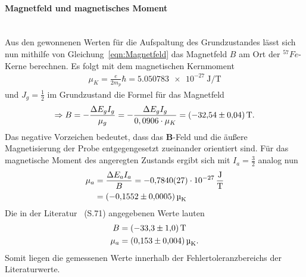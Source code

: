 \documentclass[a4paper,twoside,final]{article}
\begin{document}
\paragraph{Magnetfeld und magnetisches Moment}$~$\\
Aus den gewonnenen Werten für die Aufspaltung des Grundzustandes lässt sich nun mithilfe von Gleichung~\eqref{eqn:Magnetfeld} das Magnetfeld $B$ am Ort der $^{57}Fe$-Kerne berechnen. Es folgt mit dem magnetischen Kernmoment
\begin{align}
  \mu_K = \frac{e}{2m_p}\hbar = \SI[per-mode=fraction]{5,050783e-27}{\joule\per\tesla}
  \end{align}
und $J_g = \frac{1}{2}$ im Grundzustand die Formel für das Magnetfeld
  \begin{align}
  \Rightarrow B = -\frac{\Delta E_g I_g}{\mu_g} = -\frac{\Delta E_g I_g}{0,0906\cdot\mu_K} = \SI[separate-uncertainty]{-32,54 \pm 0,04}{\tesla}.
  \end{align}
Das negative Vorzeichen bedeutet, dass das $\bm{B}$-Feld und die äußere Magnetisierung der Probe entgegengesetzt zueinander orientiert sind. Für das magnetische Moment des angeregten Zustands ergibt sich mit $I_a = \frac{3}{2}$ analog nun
  \begin{align}
  \mu_a &= \frac{\Delta E_a I_a}{B} = \SI[per-mode=fraction]{-0,7840 \pm 0,0027e-27}{\joule\per\tesla}\\
  &= \SI[separate-uncertainty]{-0,1552\pm 0,0005}{\micro_K}
\end{align}
Die in der Literatur~\cite{Schatz} (S.71) angegebenen Werte lauten
\begin{align}
  B &= \SI[separate-uncertainty]{-33,3 \pm 1,0}{\tesla}\\
  \mu_a &= \SI[separate-uncertainty]{0,153\pm 0,004}{\micro_K}.
\end{align}
Somit liegen die gemessenen Werte innerhalb der Fehlertoleranzbereichs der Literaturwerte.
\end{document}
